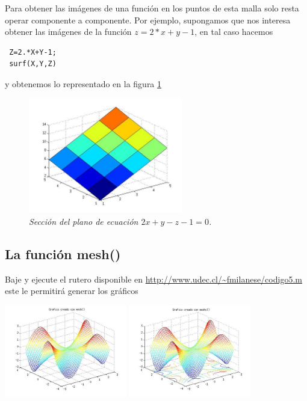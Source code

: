 \documentclass[11pt]{article}
\begin{document}
 Para obtener las im\'agenes de una funci\'on en los puntos de esta malla solo resta operar componente a componente. Por 
 ejemplo, supongamos que nos interesa obtener las im\'agenes de la funci\'on $z=2*x+y-1$, en tal caso hacemos
 \begin{verbatim}
 Z=2.*X+Y-1;
 surf(X,Y,Z)
 \end{verbatim}
 y obtenemos lo representado en la figura \ref{fig:plano}
      \begin{figure}[htp]
      \begin{center}
      \includegraphics[width=0.6\textwidth]{./plano.jpg}
      \caption{\sl Secci\'on del plano de ecuaci\'on $2x+y-z-1=0$.}
      \label{fig:plano}
      \end{center}
      \end{figure} 

\newpage
\subsection{La funci\'on mesh()}
Baje y ejecute el rutero disponible en
\url{http://www.udec.cl/~fmilanese/codigo5.m }
este le permitir\'a generar los gr\'aficos
      \begin{center}
      \includegraphics[width=0.4\textwidth]{./g1.jpg}
      \hspace{1cm}
      \includegraphics[width=0.4\textwidth]{./g2.jpg}
      \end{center}
      
\end{document}
